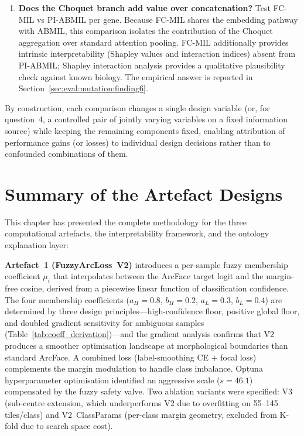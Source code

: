 \begin{enumerate}
    \item \textbf{Does the Choquet branch add value over
    concatenation?}
    Test FC-MIL vs PI-ABMIL per gene.
    Because FC-MIL shares the embedding pathway with ABMIL, this
    comparison isolates the contribution of the Choquet aggregation
    over standard attention pooling.
    FC-MIL additionally provides intrinsic interpretability (Shapley
    values and interaction indices) absent from PI-ABMIL; Shapley
    interaction analysis provides a qualitative plausibility check
    against known biology.
    The empirical answer is reported in
    Section~\ref{sec:eval:mutation:finding6}.
\end{enumerate}

By construction, each comparison changes a single design variable
(or, for question~4, a controlled pair of jointly varying variables
on a fixed information source) while keeping the remaining components
fixed, enabling attribution of performance gains (or losses) to
individual design decisions rather than to confounded combinations
of them.


\section{Summary of the Artefact Designs}
\label{sec:meth:summary}

This chapter has presented the complete methodology for the three
computational artefacts, the interpretability framework, and the
ontology explanation layer:

\textbf{Artefact~1 (FuzzyArcLoss~V2)} introduces a per-sample fuzzy
membership coefficient $\mu_i$ that interpolates between the ArcFace
target logit and the margin-free cosine, derived from a piecewise
linear function of classification confidence.
The four membership coefficients ($a_H = 0.8$, $b_H = 0.2$,
$a_L = 0.3$, $b_L = 0.4$) are determined by three design
principles---high-confidence floor, positive global floor, and
doubled gradient sensitivity for ambiguous samples
(Table~\ref{tab:coeff_derivation})---and the gradient analysis
confirms that V2 produces a smoother optimisation landscape at
morphological boundaries than standard ArcFace.
A combined loss (label-smoothing CE $+$ focal loss) complements the
margin modulation to handle class imbalance.
Optuna hyperparameter optimisation identified an aggressive scale
($s = 46.1$) compensated by the fuzzy safety valve.
Two ablation variants were specified: V3 (sub-centre extension,
which underperforms V2 due to overfitting on 55--145 tiles/class) and
V2~ClassParams (per-class margin geometry, excluded from K-fold due
to search space cost).

